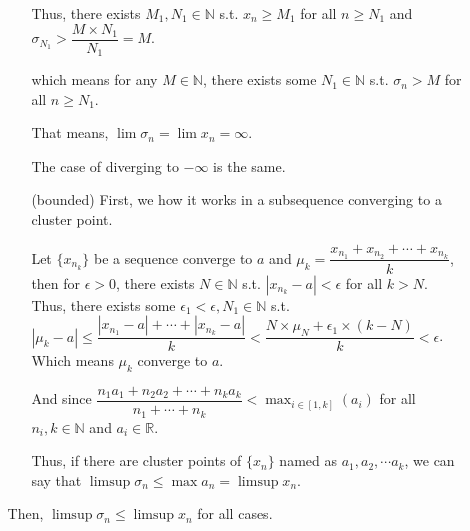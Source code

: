 \documentclass[12pt]{article}
\begin{document}
\begin{enumerate}
\begin{enumerate}[(a)]
\begin{enumerate}
            Thus, there exists $M_1, N_1 \in \mathbb{N}$ s.t. $x_n \geq M_1$ for all $n \geq N_1$ and $\sigma_{N_1} > \dfrac{M\times N_1}{N_1} = M$.

            which means for any $M \in \mathbb{N}$, there exists some $N_1 \in \mathbb{N}$ s.t. $\sigma_n > M$ for all $n \geq N_1$.

            That means, $\lim \sigma_n = \lim x_n = \infty$.

            The case of diverging to $-\infty$ is the same.

            \item[(bounded)] First, we how it works in a subsequence converging to a cluster point.
            
            Let $\lbrace x_{n_k}\rbrace$ be a sequence converge to $a$ and $\mu_{k} = \dfrac{x_{n_1} + x_{n_2} + \cdots + x_{n_k}}{k}$, then for $\epsilon > 0$, there exists $N\in \mathbb{N}$ s.t. $|x_{n_k} - a| < \epsilon$ for all $k > N$.
            Thus, there exists some $\epsilon_1< \epsilon, N_1\in \mathbb{N}$ s.t. $|\mu_k - a| \leq \dfrac{|x_{n_1} - a| + \cdots + |x_{n_k} - a|}{k} < \dfrac{N\times \mu_N + \epsilon_1\times (k-N)}{k} < \epsilon$.
            Which means $\mu_k$ converge to $a$.

            And since $\dfrac{n_1 a_1 + n_2 a_2 + \cdots + n_k a_k}{n_1 + \cdots + n_k} < \displaystyle\max_{i\in [1, k]}(a_i)$ for all $n_i, k\in \mathbb{N}$ and $a_i \in \mathbb{R}$.

            Thus, if there are cluster points of $\lbrace x_n\rbrace$ named as $a_1, a_2, \cdots a_k$, we can say that $\limsup \sigma_n \leq \max a_n = \limsup x_n$.
        \end{enumerate}
        
        Then, $\limsup \sigma_n \leq \limsup x_n$ for all cases.
    \end{enumerate}
\end{enumerate}
\end{document}
